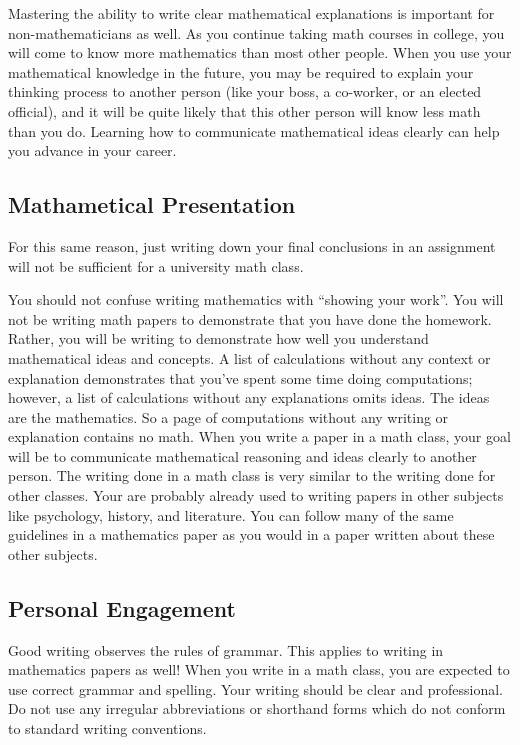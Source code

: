 \documentclass[11pt]{article}
\begin{document}
Mastering the ability to write clear mathematical explanations is important for non-mathematicians as well. As you continue taking math courses in college, you will come to know more mathematics than most other people. When you use your mathematical knowledge in the future, you may be required to explain your thinking process to another person (like your boss, a co-worker, or an elected official), and it will be quite likely that this other person will know less math than you do. Learning how to communicate mathematical ideas clearly can help you advance in your career.

\subsection{Mathametical Presentation} 
For this same reason, just writing down your final conclusions in an assignment will not be sufficient for a university math class.

You should not confuse writing mathematics with “showing your work”. You will not be writing math papers to demonstrate that you have done the homework. Rather, you will be writing to demonstrate how well you understand mathematical ideas and concepts. A list of calculations without any context or explanation demonstrates that you’ve spent some time doing computations; however, a list of calculations without any explanations omits ideas. The ideas are the mathematics. So a page of computations without any writing or explanation contains no math. When you write a paper in a math class, your goal will be to communicate mathematical reasoning and ideas clearly to another person. The writing done in a math class is very similar to the writing done for other classes. Your are probably already used to writing papers in other subjects like psychology, history, and literature. You can follow many of the same guidelines in a mathematics paper as you would in a paper written about these other subjects.

\subsection{Personal Engagement}
Good writing observes the rules of grammar. This applies to writing in mathematics papers as well! When you write in a math class, you are expected to use correct grammar and spelling. Your writing should be clear and professional. Do not use any irregular abbreviations or shorthand forms which do not conform to standard writing conventions. 
\end{document}
